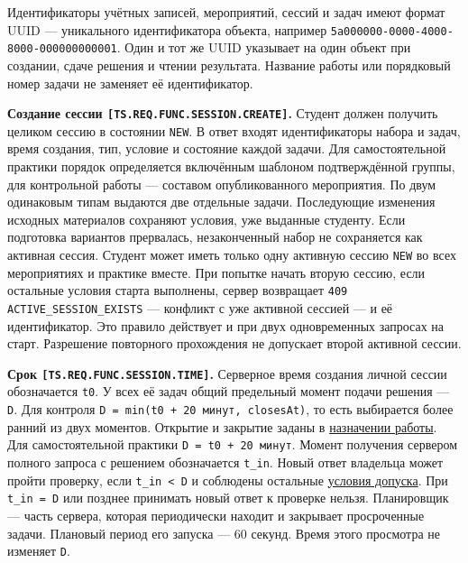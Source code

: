 \documentclass[12pt,a4paper]{article}
\begin{document}
Идентификаторы учётных записей, мероприятий, сессий и задач имеют формат UUID --- уникального идентификатора объекта, например \texttt{5a000000-\allowbreak{}0000-\allowbreak{}4000-\allowbreak{}8000-\allowbreak{}000000000001}. Один и тот же UUID указывает на один объект при создании, сдаче решения и чтении результата. Название работы или порядковый номер задачи не заменяет её идентификатор.

\hypertarget{ts-req-func-session-create}{} \textbf{Создание сессии \texttt{[TS.\allowbreak{}REQ.\allowbreak{}FUNC.\allowbreak{}SESSION.\allowbreak{}CREATE]}.} Студент должен получить целиком сессию в состоянии \texttt{NEW}. В ответ входят идентификаторы набора и задач, время создания, тип, условие и состояние каждой задачи. Для самостоятельной практики порядок определяется включённым шаблоном подтверждённой группы, для контрольной работы --- составом опубликованного мероприятия. По двум одинаковым типам выдаются две отдельные задачи. Последующие изменения исходных материалов сохраняют условия, уже выданные студенту. Если подготовка вариантов прервалась, незаконченный набор не сохраняется как активная сессия. Студент может иметь только одну активную сессию \texttt{NEW} во всех мероприятиях и практике вместе. При попытке начать вторую сессию, если остальные условия старта выполнены, сервер возвращает \texttt{409 ACTIVE\_\allowbreak{}SESSION\_\allowbreak{}EXISTS} --- конфликт с уже активной сессией --- и её идентификатор. Это правило действует и при двух одновременных запросах на старт. Разрешение повторного прохождения не допускает второй активной сессии.

\hypertarget{ts-req-func-session-time}{} \textbf{Срок \texttt{[TS.\allowbreak{}REQ.\allowbreak{}FUNC.\allowbreak{}SESSION.\allowbreak{}TIME]}.} Серверное время создания личной сессии обозначается \texttt{t0}. У всех её задач общий предельный момент подачи решения --- \texttt{D}. Для контроля \texttt{D\ =\ min(t0\ +\ 20\ минут,\ closesAt)}, то есть выбирается более ранний из двух моментов. Открытие и закрытие заданы в {\hyperlink{ts-req-func-event-schedule}{назначении работы}}. Для самостоятельной практики \texttt{D\ =\ t0\ +\ 20\ минут}. Момент получения сервером полного запроса с решением обозначается \texttt{t\_in}. Новый ответ владельца может пройти проверку, если \texttt{t\_in\ \textless{}\ D} и соблюдены остальные {\hyperlink{ts-req-func-session-submit}{условия допуска}}. При \texttt{t\_in\ =\ D} или позднее принимать новый ответ к проверке нельзя. Планировщик --- часть сервера, которая периодически находит и закрывает просроченные задачи. Плановый период его запуска --- 60 секунд. Время этого просмотра не изменяет \texttt{D}.
\end{document}
